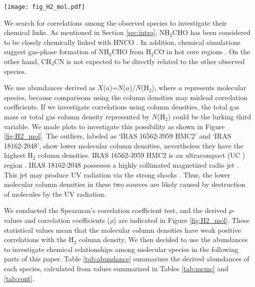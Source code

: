 \documentclass[twocolumn, twocolappendix]{aastex631}
\begin{document}
\begin{figure*}[!th]
 \begin{center}
  \texttt{[image: fig\_H2\_mol.pdf]}
 \end{center}
\caption{Relationships between the H$_{2}$ column density and molecular column densities. \label{fig:H2_mol}}
\end{figure*}

We search for correlations among the observed species to investigate their chemical links. 
As mentioned in Section \ref{sec:intro}, NH$_{2}$CHO has been considered to be closely chemically linked with HNCO \citep[e.g.,][]{2015MNRAS.449.2438L, 2019ESC.....3.2122L}.
In addition, chemical simulations suggest gas-phase formation of NH$_{2}$CHO from H$_{2}$CO in hot core regions \citep{2020ApJ...895...86G}.
On the other hand, CH$_{3}$CN is not expected to be directly related to the other observed species.

We use abundances derived as $X$($a$)=$N$($a$)/$N$(H$_{2}$), where $a$ represents molecular species, because comparisons using the column densities may mislead correlation coefficients.
If we investigate correlations using column densities, the total gas mass or total gas column density represented by $N$(H$_{2}$) could be the lurking third variable.
We made plots to investigate this possibility as shown in Figure \ref{fig:H2_mol}.
The outliers, labeled as `IRAS 16562-3959 HMC2' and `IRAS 18162-2048', show lower molecular column densities, nevertheless they have the highest H$_{2}$ column densities.
IRAS 16562-3959 HMC2 is an ultracompact  (UC ) region \citep{2018ApJS..236...45G, 2020ApJ...898...54T}. 
IRAS 18162-2048 possesses a highly collimated magnetized radio jet \citep{2010Sci...330.1209C}.
This jet may produce UV radiation via the strong shocks \citep{2017ApJ...847...58G}.
Thus, the lower molecular column densities in these two sources are likely caused by destruction of molecules by the UV radiation.

We conducted the Spearman's correlation coefficient test, and the derived $p$-values and correlation coefficients ($\rho$) are indicated in Figure \ref{fig:H2_mol}.
These statistical values mean that the molecular column densities have weak positive correlations with the H$_{2}$ column density.
We then decided to use the abundances to investigate chemical relationships among molecular species in the following parts of this paper.
Table \ref{tab:abundance} summarizes the derived abundances of each species, calculated from values summarized in Tables \ref{tab:mcmc} and \ref{tab:cont}.
\end{document}
